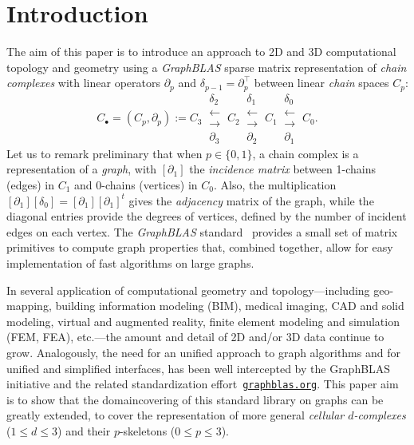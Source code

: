 \section{Introduction}\label{introduction}

The aim of this paper is to introduce an approach to 2D and 3D
computational topology and geometry using a \emph{GraphBLAS} sparse matrix
representation of \emph{chain complexes} with linear operators $\partial_p$ and $\delta_{p-1} = \partial_p^\top$ between linear \emph{chain} spaces $C_p$:
\[ 
C_\bullet = (C_p, \partial_p) := 
C_3 \ 
\substack{
\delta_2 \\
\longleftarrow \\[-1mm]
\longrightarrow \\
\partial_3 
}
\ C_2 \ 
\substack{
\delta_1 \\
\longleftarrow \\[-1mm]
\longrightarrow \\
\partial_2 
}
\ C_1 \ 
\substack{
\delta_0 \\
\longleftarrow \\[-1mm]
\longrightarrow \\
\partial_1 
}
\ C_0 .
\] 
Let us to remark preliminary that when $p\in \{0,1\}$, a chain complex is a representation of a \emph{graph}, with $[\partial_1]$ the \emph{incidence matrix} between 1-chains (edges) in $C_1$ and 0-chains (vertices) in $C_0$. Also, the multiplication $[\partial_1][\delta_0]=[\partial_1][\partial_1]^t$ gives the \emph{adjacency} matrix of the graph, while the diagonal entries provide the degrees of vertices, defined by the number of incident edges on each vertex. The \emph{GraphBLAS} standard~\cite{GraphBLAS:standard} provides a small set of matrix primitives to compute graph properties that, combined together, allow for easy implementation of fast algorithms on large graphs.

In several application of computational geometry and topology---including
geo-mapping, building information modeling (BIM), medical imaging, CAD and
solid modeling, virtual and augmented reality, finite element modeling
and simulation (FEM, FEA), etc.---the amount and detail of 2D and/or 3D data
continue to grow. Analogously, the need for an unified approach to
graph algorithms and for unified and simplified interfaces, has been
well intercepted by the GraphBLAS initiative and the related 
standardization effort~\href{http://graphblas.org}{\texttt{graphblas.org}}. 
This paper aim is to show that the domaincovering of this standard library on graphs can be greatly extended, to cover the representation of more general \emph{cellular $d$-complexes} ($1\leq d\leq 3$) and their $p$-skeletons ($0\leq p\leq 3$).

